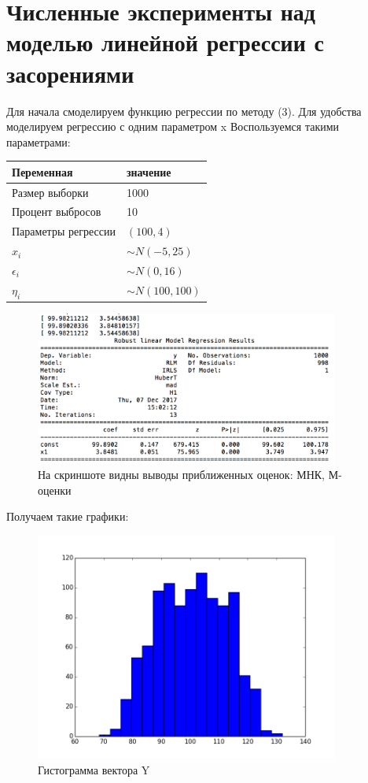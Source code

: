 \documentclass[12pt]{article}
\begin{document}
\section{Численные эксперименты над моделью линейной регрессии с засорениями}
Для начала смоделируем функцию регрессии по методу (3). Для удобства моделируем регрессию с одним параметром x\hfill\break
Воспользуемся такими параметрами:\hfill\break
\begin{tabular}{|p{3cm}|p{10cm}|}
    \hline
    Переменная&значение\\
    \hline
    Размер выборки & 1000\\
    Процент выбросов & 10\\
    Параметры регрессии & $(100,4)$\\
    $x_i$ & $\sim N(-5,25)$\\
    $\epsilon_i$&$\sim N(0,16)$\\
    $\eta_i$&$\sim N(100,100)$\\
    \hline
\end{tabular}\hfill\break
\begin{figure}[h!]
    \centering
    \includegraphics[width=100mm]{program_output.png}
    \caption{На скриншоте видны выводы приближенных оценок: МНК, М-оценки\label{overflow}}
\end{figure}
\newpage
Получаем такие графики:\hfill\break
\begin{figure}[ht!]
    \centering
    \includegraphics[width=100mm]{histogram.png}
    \caption{Гистограмма вектора Y\label{overflow}}
\end{figure}
\end{document}
